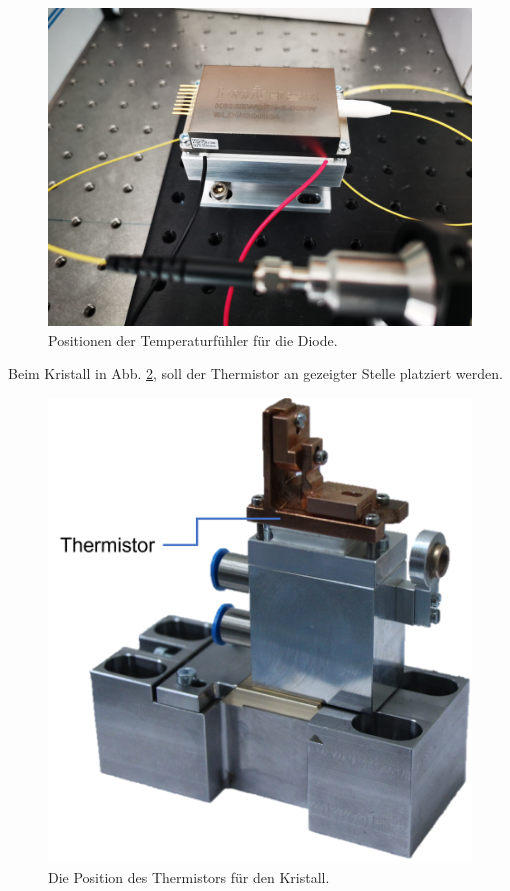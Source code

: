\begin{figure}[H]
    \centering
    \includegraphics[scale=0.08, trim={100mm 100mm 100mm 100mm}, clip]{98_images/IMG_20240322_111841.jpg}
    \caption{Positionen der Temperaturfühler für die Diode.}
    \label{fig:temp_measurement_hw_1}
\end{figure}

Beim Kristall in Abb. \ref{fig:thermistor_cr}, soll der Thermistor an gezeigter Stelle platziert werden.

\begin{figure}[H]
    \centering
    \includegraphics[scale=0.5, trim=0mm 70mm 0mm 0mm, clip]{98_images/thermistor_cr.png}
    \caption{Die Position des Thermistors für den Kristall.}
    \label{fig:thermistor_cr}
\end{figure}

